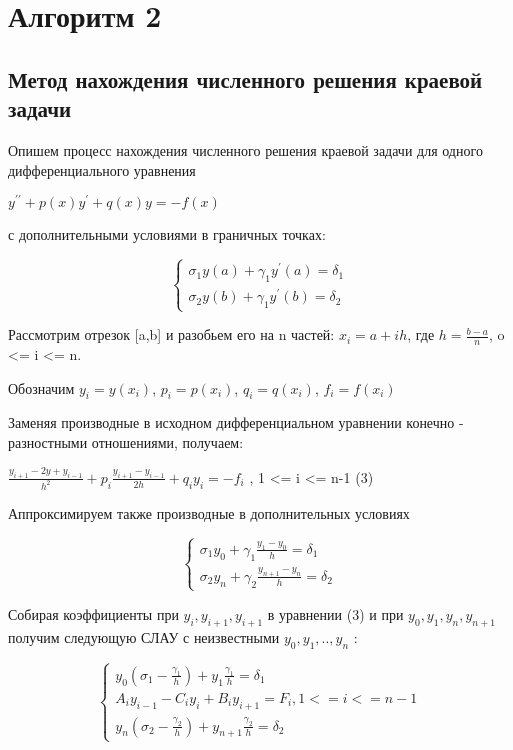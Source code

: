 \documentclass[a4paper,12pt,titlepage,finall]{article}
\begin{document}
\section{Алгоритм 2}
\subsection{Метод нахождения численного решения краевой задачи}

Опишем процесс нахождения численного решения краевой задачи для одного
дифференциального уравнения

$y^{\prime\prime} + p(x) y^{\prime} + q(x) y = -f(x)$

с дополнительными условиями в граничных точках:

\begin{equation*}
 \begin{cases}
   {\sigma}_1 y(a) + {\gamma}_1 y^{\prime}(a) = {\delta}_1
   \\
   {\sigma_2} y(b) + {\gamma}_1 y^{\prime}(b) = {\delta}_2
 \end{cases}
\end{equation*}

Рассмотрим отрезок [a,b] и разобьем его на n частей:
$x_i = a +ih$, где $h = \frac{b - a}{n}$, o <= i <= n.

Обозначим $y_i = y(x_i)$, $p_i = p(x_i)$, $q_i = q(x_i)$, $f_i = f(x_i)$

Заменяя производные в исходном дифференциальном уравнении конечно - разностными отношениями, получаем:

$\frac{y_{i+1} - 2y + y_{i-1}}{h^{2}} + p_i \frac{y_{i+1} - y_{i-1}}{2h} + q_i y_i = -f_i$ , 1 <= i <= n-1    (3)

Аппроксимируем также производные в дополнительных условиях

\begin{equation*}
 \begin{cases}
   {\sigma}_1 y_0 + {\gamma}_1 \frac{y_1 - y_0}{h} = {\delta}_1
   \\
   {\sigma}_2 y_n + {\gamma}_2 \frac{y_{n+1} - y_n}{h} = {\delta}_2
 \end{cases}
\end{equation*}


Собирая коэффициенты при $y_i , y_{i+1} , y_{i+1} $ в уравнении (3) и при $y_0 , y_1 , y_n , y_{n+1}$ получим следующую СЛАУ с неизвестными $y_0 , y_1 , .. , y_n$ :

\begin{equation*}
 \begin{cases}
   y_0 ({\sigma}_1 - \frac{{\gamma}_1}{h}) + y_1 \frac{{\gamma}_1}{h} = {\delta}_1
   \\
   A_i y_{i-1} - C_i y_i + B_i y_{i+1} = F_i , 1 <= i <= n - 1
   \\
   y_n ({\sigma}_2 - \frac{{\gamma}_2}{h}) + y_{n+1} \frac{{\gamma}_2}{h} = {\delta}_2
 \end{cases}
\end{equation*}
\end{document}
